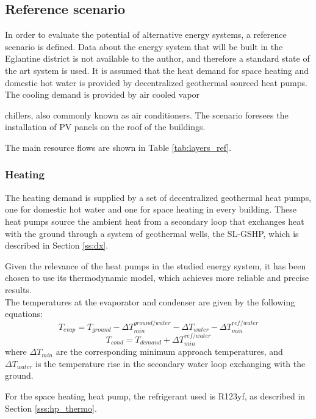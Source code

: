 \documentclass{article}
\begin{document}
\subsection{Reference scenario}
In order to evaluate the potential of alternative energy systems, a reference scenario is defined. Data about the energy system that will be built in the Eglantine district is not available to the author, and therefore a standard state of the art system is used. It is assumed that the heat demand for space heating and domestic hot water is provided by decentralized geothermal sourced heat pumps. The cooling demand is provided by air cooled vapor 

 chillers, also commonly known as air conditioners. The scenario foresees the installation of PV panels on the roof of the buildings.


The main resource flows are shown in Table \ref{tab:layers_ref}.


\subsubsection{Heating}
The heating demand is supplied by a set of decentralized geothermal heat pumps, one for domestic hot water and one for space heating in every building. These heat pumps source the ambient heat from a secondary loop that exchanges heat with the ground through a system of geothermal wells, the SL-GSHP, which is described in Section \ref{ss:dx}. 

Given the relevance of the heat pumps in the studied energy system, it has been chosen to use its thermodynamic model, which achieves more reliable and precise results.\\

The temperatures at the evaporator and condenser are given by the following equations:
\begin{equation}
    T_{evap} = T_{ground} - \Delta T_{min}^{ground/water} - \Delta T_{water} - \Delta T_{min}^{ref/water}
\end{equation}
\begin{equation}
    T_{cond} = T_{demand} + \Delta T_{min}^{ref/water}
\end{equation}
where $\Delta T_{min}$ are the corresponding minimum approach temperatures, and $\Delta T_{water}$ is the temperature rise in the secondary water loop exchanging with the ground.

For the space heating heat pump, the refrigerant used is R123yf, as described in Section \ref{sss:hp_thermo}.\\
\end{document}
